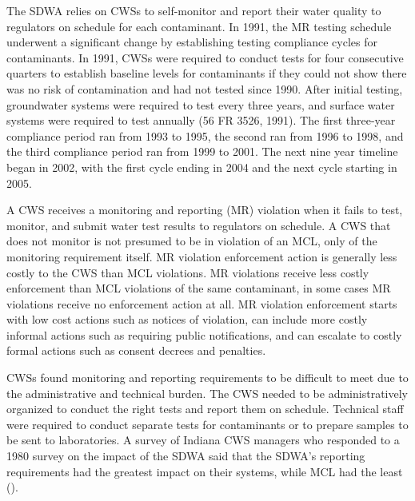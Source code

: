 \documentclass{article}
\begin{document}
The SDWA relies on CWSs to self-monitor and report their water quality to regulators on schedule for each contaminant. In 1991, the MR testing schedule underwent a significant change by establishing testing compliance cycles for contaminants. In 1991, CWSs were required to conduct tests for four consecutive quarters to establish baseline levels for contaminants if they could not show there was no risk of contamination and had not tested since 1990. After initial testing, groundwater systems were required to test every three years, and surface water systems were required to test annually (56 FR 3526, 1991). The first three-year compliance period ran from 1993 to 1995, the second ran from 1996 to 1998, and the third compliance period ran from 1999 to 2001. The next nine year timeline began in 2002, with the first cycle ending in 2004 and the next cycle starting in 2005.

A CWS receives a monitoring and reporting (MR) violation when it fails to test, monitor, and submit water test results to regulators on schedule. A CWS that does not monitor is not presumed to be in violation of an MCL, only of the monitoring requirement itself. MR violation enforcement action is generally less costly to the CWS than MCL violations. MR violations receive less costly enforcement than MCL violations of the same contaminant, in some cases MR violations receive no enforcement action at all. MR violation enforcement starts with low cost actions such as notices of violation, can include more costly informal actions such as requiring public notifications, and can escalate to costly formal actions such as consent decrees and penalties.

CWSs found monitoring and reporting requirements to be difficult to meet due to the administrative and technical burden. The CWS needed to be administratively organized to conduct the right tests and report them on schedule. Technical staff were required to conduct separate tests for contaminants or to prepare samples to be sent to laboratories. A survey of Indiana CWS managers who responded to a 1980 survey on the impact of the SDWA said that the SDWA's reporting requirements had the greatest impact on their systems, while MCL had the least (\cite{oleckno1982national}). 
\end{document}
